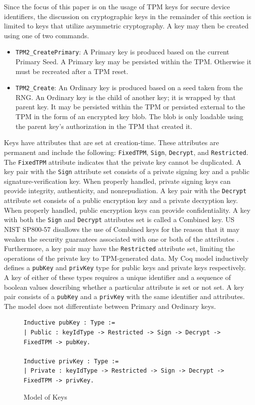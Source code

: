 \documentclass[runningheads]{llncs}
\begin{document}
Since the focus of this paper is on the usage of TPM keys for secure device identifiers, the discussion on cryptographic keys in the remainder of this section is limited to keys that utilize asymmetric cryptography.  A key may then be created using one of two commands.
\begin{itemize}
  \item \verb|TPM2_CreatePrimary|: A Primary key is produced based on the current Primary Seed. A Primary key may be persisted within the TPM. Otherwise it must be recreated after a TPM reset.
  \item \verb|TPM2_Create|: An Ordinary key is produced based on a seed taken from the RNG. An Ordinary key is the child of another key; it is wrapped by that parent key. It may be persisted within the TPM or persisted external to the TPM in the form of an encrypted key blob. The blob is only loadable using the parent key's authorization in the TPM that created it.
\end{itemize}
Keys have attributes that are set at creation-time. These attributes are permanent and include the following: \verb|FixedTPM|, \verb|Sign|, \verb|Decrypt|, and \verb|Restricted|. The \verb|FixedTPM| attribute indicates that the private key cannot be duplicated. A key pair with the \verb|Sign| attribute set consists of a private signing key and a public signature-verification key. When properly handled, private signing keys can provide integrity, authenticity, and nonrepudiation. A key pair with the \verb|Decrypt| attribute set consists of a public encryption key and a private decryption key. When properly handled, public encryption keys can provide confidentiality. A key with both the \verb|Sign| and \verb|Decrypt| attributes set is called a Combined key. US NIST SP800-57 disallows the use of Combined keys for the reason that it may weaken the security guarantees associated with one or both of the attributes \cite{KeyManagement}. Furthermore, a key pair may have the \verb|Restricted| attribute set, limiting the operations of the private key to TPM-generated data.
My Coq model inductively defines a \verb|pubKey| and \verb|privKey| type for public keys and private keys respectively. A key of either of these types requires a unique identifier and a sequence of boolean values describing whether a particular attribute is set or not set. A key pair consists of a \verb|pubKey| and a \verb|privKey| with the same identifier and attributes. The model does not differentiate between Primary and Ordinary keys.
\begin{figure}[h]
\begin{lstlisting}[language=Coq]
Inductive pubKey : Type :=
| Public : keyIdType -> Restricted -> Sign -> Decrypt -> FixedTPM -> pubKey.

Inductive privKey : Type :=
| Private : keyIdType -> Restricted -> Sign -> Decrypt -> FixedTPM -> privKey.
\end{lstlisting}

\caption{Model of Keys}
\end{figure}
\end{document}
